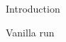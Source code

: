 \documentclass[10pt,a4paper]{article}
\begin{document}
\begin{section}{Introduction}
\begin{subsection}{Vanilla run}



\end{subsection}

\end{section}
\end{document}
